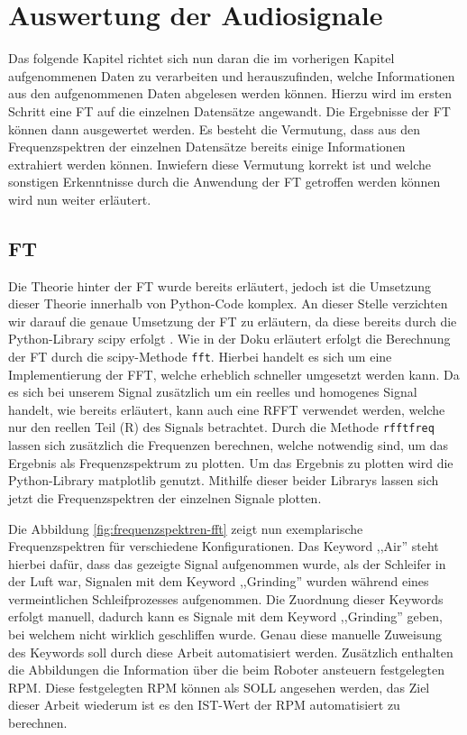 \chapter{Auswertung der Audiosignale}
\label{Kapitel6}

Das folgende Kapitel richtet sich nun daran die im vorherigen Kapitel aufgenommenen Daten zu verarbeiten und herauszufinden, welche Informationen aus den aufgenommenen Daten abgelesen werden können. Hierzu wird im ersten Schritt eine \ac{FT} auf die einzelnen Datensätze angewandt. Die Ergebnisse der \ac{FT} können dann ausgewertet werden. Es besteht die Vermutung, dass aus den Frequenzspektren der einzelnen Datensätze bereits einige Informationen extrahiert werden können. Inwiefern diese Vermutung korrekt ist und welche sonstigen Erkenntnisse durch die Anwendung der \ac{FT} getroffen werden können wird nun weiter erläutert. 

\section{FT}
Die Theorie hinter der \ac{FT} wurde bereits erläutert, jedoch ist die Umsetzung dieser Theorie innerhalb von Python-Code komplex. An dieser Stelle verzichten wir darauf die genaue Umsetzung der \ac{FT} zu erläutern, da diese bereits durch die Python-Library scipy erfolgt \cite{scipy-fft}. Wie in der Doku erläutert erfolgt die Berechnung der \ac{FT} durch die scipy-Methode \texttt{fft}. Hierbei handelt es sich um eine Implementierung der \ac{FFT}, welche erheblich schneller umgesetzt werden kann. Da es sich bei unserem Signal zusätzlich um ein reelles und homogenes Signal handelt, wie bereits erläutert, kann auch eine RFFT verwendet werden, welche nur den reellen Teil (R) des Signals betrachtet. Durch die Methode \texttt{rfftfreq} lassen sich zusätzlich die Frequenzen berechnen, welche notwendig sind, um das Ergebnis als Frequenzspektrum zu plotten. Um das Ergebnis zu plotten wird die Python-Library matplotlib genutzt. \cite{matplotlib} Mithilfe dieser beider Librarys lassen sich jetzt die Frequenzspektren der einzelnen Signale plotten. 

Die Abbildung \ref{fig:frequenzspektren-fft} zeigt nun exemplarische Frequenzspektren für verschiedene Konfigurationen. Das Keyword ,,Air'' steht hierbei dafür, dass das gezeigte Signal aufgenommen wurde, als der Schleifer in der Luft war, Signalen mit dem Keyword ,,Grinding'' wurden während eines vermeintlichen Schleifprozesses aufgenommen. Die Zuordnung dieser Keywords erfolgt manuell, dadurch kann es Signale mit dem Keyword ,,Grinding'' geben, bei welchem nicht wirklich geschliffen wurde. Genau diese manuelle Zuweisung des Keywords soll durch diese Arbeit automatisiert werden. Zusätzlich enthalten die Abbildungen die Information über die beim Roboter ansteuern festgelegten RPM. Diese festgelegten RPM können als SOLL angesehen werden, das Ziel dieser Arbeit wiederum ist es den IST-Wert der RPM automatisiert zu berechnen. 

